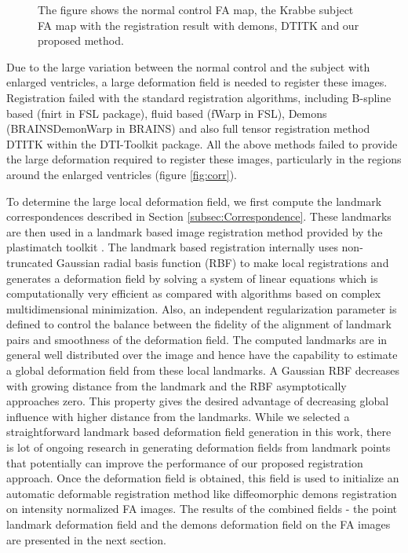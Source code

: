 \documentclass{llncs}
\begin{document}
\begin{figure}
    \label{fig:regMatch}
    \caption{The figure shows the normal control FA map, the Krabbe subject FA map with the registration result with demons, DTITK and our proposed method.}
\end{figure}

Due to the large variation between the normal control and the subject with enlarged ventricles, a large deformation field is needed to register these images. Registration failed with the standard registration algorithms, including B-spline based (fnirt in FSL package), fluid based (fWarp in FSL), Demons (BRAINSDemonWarp in BRAINS) and also full tensor registration method DTITK within the DTI-Toolkit package. All the above methods failed to provide the large deformation required to register these images, particularly in the regions around the enlarged ventricles (figure \ref{fig:corr}).

To determine the large local deformation field, we first compute the landmark correspondences described in Section \ref{subsec:Correspondence}. These landmarks are then used in a landmark based image registration method provided by the plastimatch toolkit \cite{Sharp10}. The landmark based registration internally uses non-truncated Gaussian radial basis function (RBF) to make local registrations and generates a deformation field by solving a system of linear equations which is computationally very efficient as compared with algorithms based on complex multidimensional minimization. Also, an independent regularization parameter is defined to control the balance between the fidelity of the alignment of landmark pairs and smoothness of the deformation field. The computed landmarks are in general well distributed over the image and hence have the capability to estimate a global deformation field from these  local landmarks. A Gaussian RBF decreases with growing distance from the landmark and the RBF asymptotically approaches zero. This property gives the desired advantage of decreasing global influence with higher distance from the landmarks. While we selected a straightforward landmark based deformation field generation in this work, there is lot of ongoing research in generating deformation fields from landmark points that potentially can improve the performance of our proposed registration approach. Once the deformation field is obtained, this field is used to initialize an automatic deformable registration method like diffeomorphic demons registration on intensity normalized FA images. The results of the combined fields - the point landmark deformation field and the demons deformation field on the FA images are presented in the next section.
\end{document}
